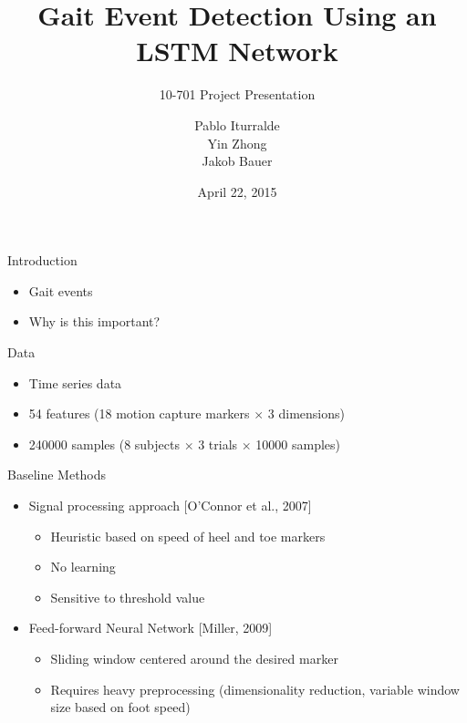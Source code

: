 \documentclass{beamer}
\title
{
    Gait Event Detection Using an LSTM Network
}
\subtitle
{
    10-701
    Project Presentation
}
\author
{
    Pablo Iturralde\\
    Yin Zhong\\
    Jakob Bauer
}
\date
{
    April 22, 2015
}
\begin{document}
\begin{frame}
  \titlepage
\end{frame}

\begin{frame}{Introduction}
    \begin{itemize}
        \item
        Gait events
        \item
        Why is this important?
    \end{itemize}
\end{frame}

\begin{frame}{Data}
    \begin{itemize}
        \item
            Time series data
        \item
            54 features 
            (18 motion capture markers $\times$ 3 dimensions)
        \item
            \num{240000} samples 
            (8 subjects $\times$ 3 trials $\times$ \num{10000} samples)
    \end{itemize}
\end{frame}

\begin{frame}{Baseline Methods}
    \begin{itemize}
        \item
            Signal processing approach [O'Connor et al., 2007]
            \begin{itemize}
                \item
                    Heuristic based on speed of heel and toe markers
                \item
                    No learning
                \item
                    Sensitive to threshold value
            \end{itemize}
        \item
            Feed-forward Neural Network [Miller, 2009]
            \begin{itemize}
                \item
                    Sliding window centered around the desired marker
                \item
                    Requires heavy preprocessing (dimensionality reduction,
                    variable window size based on foot speed)
            \end{itemize}
    \end{itemize}
\end{frame}
\end{document}
